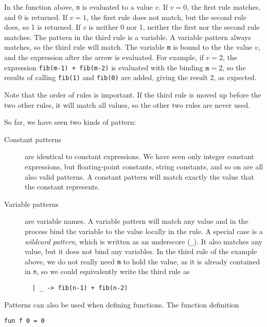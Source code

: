 \documentclass[a4paper]{article}
\begin{document}
In the function above, \texttt{n} is evaluated to a value $v$.  If
$v=0$, the first rule matches, and 0 is returned.  If $v=1$, the first
rule does not match, but the second rule does, so 1 is returned.  If
$v$ is neither 0 nor 1, neither the first nor the second rule
matches.  The pattern in the third rule is a variable.  A variable
pattern always matches, so the third rule will match.  The variable
\texttt{m} is bound to the the value $v$, and the expression after the
arrow is evaluated.  For example, if $v=2$, the expression
\texttt{fib(m-1) + fib(m-2)} is evaluated with the binding
$\texttt{m}=2$, so the results of calling \texttt{fib(1)} and
\texttt{fib(0)} are added, giving the result 2, as expected.

Note that the order of rules is important.  If the third rule is moved
up before the two other rules, it will match all values, so the other
two rules are never used.

So far, we have seen two kinds of pattern:

\begin{description}

\item[Constant patterns] are identical to constant expressions.  We
  have seen only integer constant expressions, but floating-point
  constants, string constants, and so on are all also valid patterns.
  A constant pattern will match exactly the value that the constant
  represents.
\item[Variable patterns] are variable names. A variable pattern will
  match any value and in the process bind the variable to the value
  locally in the rule.  A special case is a \emph{wildcard pattern},
  which is written as an underscore (\verb|_|).  It also matches any
  value, but it does not bind any variables.  In the third rule of the
  example above, we do not really need \texttt{m} to hold the value,
  as it is already contained in \texttt{n}, so we could equivalently
  write the third rule as

\begin{verbatim}
  | _ -> fib(n-1) + fib(n-2)
\end{verbatim}

\end{description}


\noindent
Patterns can also be used when defining functions.  The function
definition

\begin{verbatim}
fun f 0 = 0
\end{verbatim}
\end{document}
